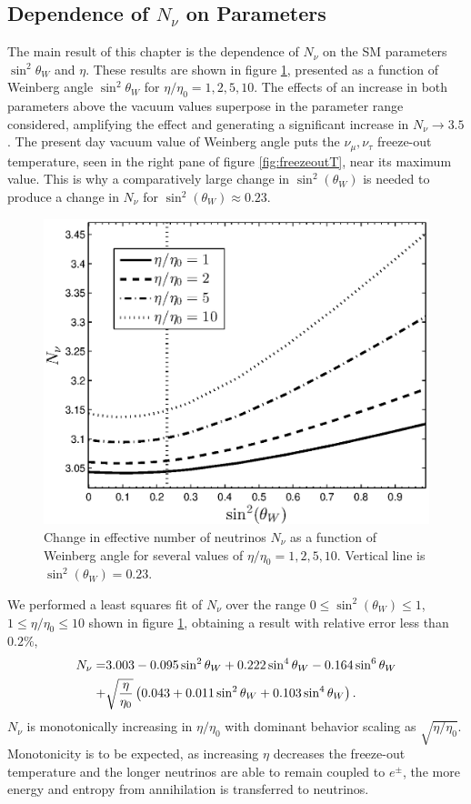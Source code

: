 \subsection{Dependence of $N_\nu$ on Parameters}\label{sec:param_char}

The main result  of this chapter is the  dependence of $N_\nu$ on  the SM parameters   $\sin^2\theta_W$ and $\eta$. These results are shown in  figure \ref{N_nu_params}, presented as a function of  Weinberg angle $\sin^2 \theta_W $ for $\eta/\eta_0=1,2,5,10$. The effects of an increase in both parameters above the vacuum values superpose  in the parameter range  considered, amplifying the effect and generating a significant increase in  $N_\nu\to 3.5$. The present day vacuum value of Weinberg angle puts the $\nu_\mu,\nu_\tau$ freeze-out temperature, seen in the right pane of figure \ref{fig:freezeoutT},  near its maximum value.  This is why a comparatively large change in $\sin^2(\theta_W)$ is needed to produce a change in $N_\nu$ for $\sin^2(\theta_W)\approx0.23$.
 
\begin{figure}%
\centerline{\includegraphics[width=0.70\columnwidth]{04-birrell/ParametricStudies/N_eff2.eps}
}
\caption{Change in effective number of neutrinos  $N_\nu$ as a function of Weinberg angle for  several values of $\eta/\eta_0=1,2,5,10$. Vertical line is $\sin^2(\theta_W)=0.23$.}
\label{N_nu_params}  
 \end{figure}
We performed a least squares fit of $N_\nu$ over the range $0\leq \sin^2(\theta_W)\leq 1$, $1\leq \eta/\eta_0\leq 10$ shown in figure \ref{N_nu_params}, obtaining a result with relative error less than $0.2\%$,
\begin{align}
N_\nu=&3.003-0.095\sin^2\theta_W +0.222\sin^4\theta_W  -0.164\sin^6\theta_W \notag\\
+&\sqrt{\frac{\eta}{\eta_0}}\left(0.043+0.011\sin^2\theta_W +0.103\sin^4\theta_W\right).
\end{align}
$N_\nu$ is monotonically increasing in $\eta/\eta_0$ with dominant behavior  scaling as $\sqrt{ \eta/\eta_0}$. Monotonicity is to be expected, as increasing $\eta$ decreases the freeze-out temperature and the longer neutrinos are able to remain coupled to $e^\pm$, the more energy and entropy from annihilation is transferred to neutrinos.

